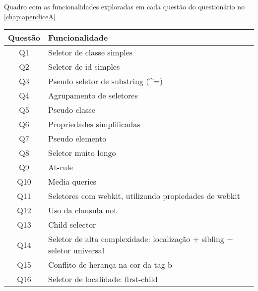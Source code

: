 \begin{quadro}[!htb]
\centering
\caption{Quadro com as funcionalidades exploradas em cada questão do questionário no \autoref{chap:apendiceA}}
\label{quad:questionXfunc}
\begin{tabular}{|c|l|}
\hline
\textbf{Questão} & \textbf{Funcionalidade}                                                  \\ \hline
Q1               & Seletor de classe simples                                                \\ \hline
Q2               & Seletor de id simples                                                    \\ \hline
Q3               & Pseudo seletor de substring (\textasciicircum =)                         \\ \hline
Q4               & Agrupamento de seletores                                                 \\ \hline
Q5               & Pseudo classe                                                            \\ \hline
Q6               & Propriedades simplificadas                                               \\ \hline
Q7               & Pseudo elemento                                                          \\ \hline
Q8               & Seletor muito longo                                                      \\ \hline
Q9               & At-rule                                                                  \\ \hline
Q10              & Media queries                                                            \\ \hline
Q11              & Seletores com webkit, utilizando propiedades de webkit                   \\ \hline
Q12              & Uso da clausula not                                                      \\ \hline
Q13              & Child selector                                                           \\ \hline
Q14              & Seletor de alta complexidade: localização + sibling  + seletor universal \\ \hline
Q15              & Conflito de herança na cor da tag b                                      \\ \hline
Q16              & Seletor de localidade: first-child                                       \\ \hline
\end{tabular}
\end{quadro}